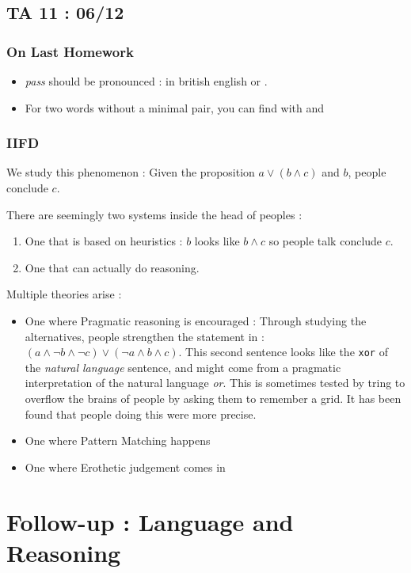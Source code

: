 \documentclass{cours}
\begin{document}
\subsection{TA 11\! : 06/12}
\subsubsection{On Last Homework}
\begin{itemize}
    \item \textsl{pass} should be pronounced : \textipa{[p\super{h}A:s]} in british english or \textipa{[p\super{h}\ae s]}.
    \item For two words without a minimal pair, you can find with \textipa{[Z]} and \textipa{[t]}
\end{itemize}
\subsubsection{IIFD}
We study this phenomenon : Given the proposition $a \lor \left(b \land c\right)$ and $b$, people conclude $c$.


There are seemingly two systems inside the head of peoples :
\begin{enumerate}
    \item One that is based on heuristics : $b$ looks like $b \land c$ so people talk conclude $c$.
    \item One that can actually do reasoning.
\end{enumerate}

Multiple theories arise :
\begin{itemize}
    \item One where Pragmatic reasoning is encouraged :
          Through studying the alternatives, people strengthen the statement in : $\left(a \land \lnot b \land \lnot c\right) \lor \left(\lnot a\land b \land c\right)$. This second sentence looks like the \texttt{xor} of the \textit{natural language} sentence, and might come from a pragmatic interpretation of the natural language \textsl{or}.  This is sometimes tested by tring to overflow the brains of people by asking them to remember a grid. It has been found that people doing this were more precise.
    \item One where Pattern Matching happens
    \item One where Erothetic judgement comes in
\end{itemize}


\section[Class 10\!: 14/12]{Follow-up : Language and Reasoning}
\end{document}
